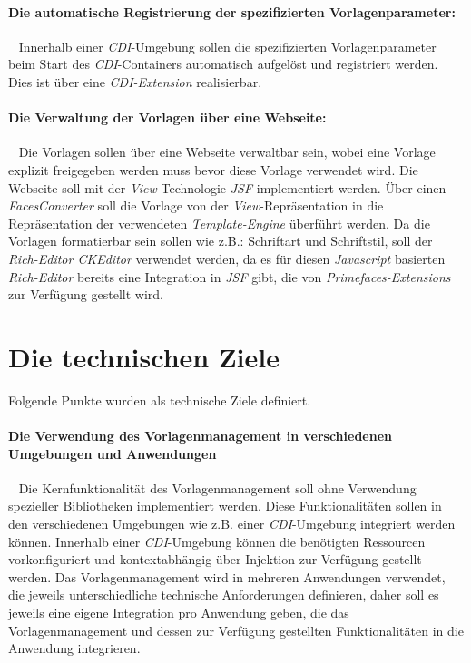 \paragraph{Die automatische Registrierung der spezifizierten Vorlagenparameter:}
\ \newline
Innerhalb einer \emph{CDI}-Umgebung sollen die spezifizierten Vorlagenparameter beim Start des \emph{CDI}-Containers automatisch aufgelöst und registriert werden. Dies ist über eine \emph{CDI-Extension} realisierbar.

\paragraph{Die Verwaltung der Vorlagen über eine Webseite:}
\ \newline
Die Vorlagen sollen über eine Webseite verwaltbar sein, wobei eine Vorlage explizit freigegeben werden muss bevor diese Vorlage verwendet wird. Die Webseite soll mit der \emph{View}-Technologie \emph{JSF} implementiert werden. Über einen \emph{FacesConverter} soll die Vorlage von der \emph{View}-Repräsentation in die Repräsentation der verwendeten \emph{Template-Engine} überführt werden.
\newline
\newline
Da die Vorlagen formatierbar sein sollen wie z.B.: Schriftart und Schriftstil, soll der \emph{Rich-Editor CKEditor} verwendet werden, da es für diesen \emph{Javascript} basierten \emph{Rich-Editor} bereits eine Integration in \emph{JSF} gibt, die von \emph{Primefaces-Extensions} zur Verfügung gestellt wird. 

\section{Die technischen Ziele}
Folgende Punkte wurden als technische Ziele definiert.
\paragraph{Die Verwendung des Vorlagenmanagement in verschiedenen Umgebungen und Anwendungen}
\ \newline
Die Kernfunktionalität des Vorlagenmanagement soll ohne Verwendung spezieller Bibliotheken implementiert werden. Diese Funktionalitäten sollen in den verschiedenen Umgebungen wie z.B. einer \emph{CDI}-Umgebung integriert werden können. Innerhalb einer \emph{CDI}-Umgebung können die benötigten Ressourcen vorkonfiguriert und kontextabhängig über Injektion zur Verfügung gestellt werden.
\newline
\newline
Das Vorlagenmanagement wird in mehreren Anwendungen verwendet, die jeweils unterschiedliche technische Anforderungen definieren, daher soll es jeweils eine eigene Integration pro Anwendung geben, die das Vorlagenmanagement und dessen zur Verfügung gestellten Funktionalitäten in die Anwendung integrieren.

